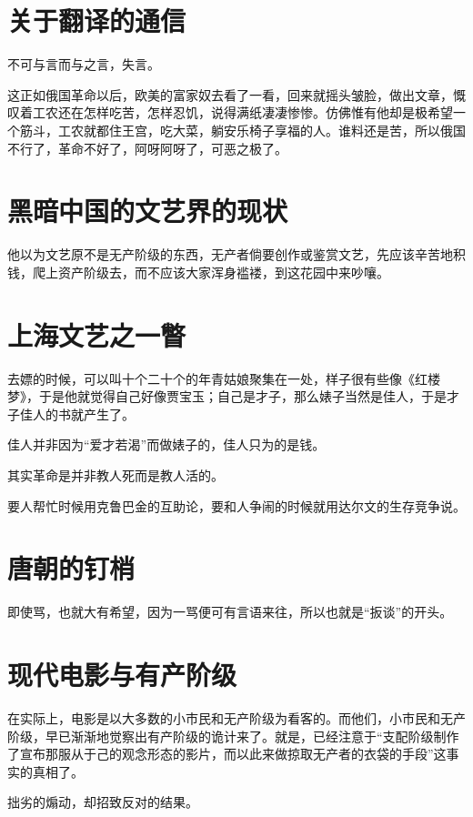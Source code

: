\documentclass[a4paper]{article}
\begin{document}
\begin{sloppy}
        \section{
            关于翻译的通信
        }
        不可与言而与之言，失言。

        这正如俄国革命以后，欧美的富家奴去看了一看，回来就摇头皱脸，做出文章，慨叹着工农还在怎样吃苦，怎样忍饥，说得满纸凄凄惨惨。仿佛惟有他却是极希望一个筋斗，工农就都住王宫，吃大菜，躺安乐椅子享福的人。谁料还是苦，所以俄国不行了，革命不好了，阿呀阿呀了，可恶之极了。

        \section{
            黑暗中国的文艺界的现状
        }
        他以为文艺原不是无产阶级的东西，无产者倘要创作或鉴赏文艺，先应该辛苦地积钱，爬上资产阶级去，而不应该大家浑身褴褛，到这花园中来吵嚷。

        \section{
            上海文艺之一瞥
        }
        去嫖的时候，可以叫十个二十个的年青姑娘聚集在一处，样子很有些像《红楼梦》，于是他就觉得自己好像贾宝玉；自己是才子，那么婊子当然是佳人，于是才子佳人的书就产生了。

        佳人并非因为“爱才若渴”而做婊子的，佳人只为的是钱。

        其实革命是并非教人死而是教人活的。

        要人帮忙时候用克鲁巴金的互助论，要和人争闹的时候就用达尔文的生存竞争说。

        \section{
            唐朝的钉梢
        }
        即使骂，也就大有希望，因为一骂便可有言语来往，所以也就是“扳谈”的开头。

        \section{
            现代电影与有产阶级
        }
        在实际上，电影是以大多数的小市民和无产阶级为看客的。而他们，小市民和无产阶级，早已渐渐地觉察出有产阶级的诡计来了。就是，已经注意于“支配阶级制作了宣布那服从于己的观念形态的影片，而以此来做掠取无产者的衣袋的手段”这事实的真相了。

        拙劣的煽动，却招致反对的结果。


\end{sloppy}
\end{document}
